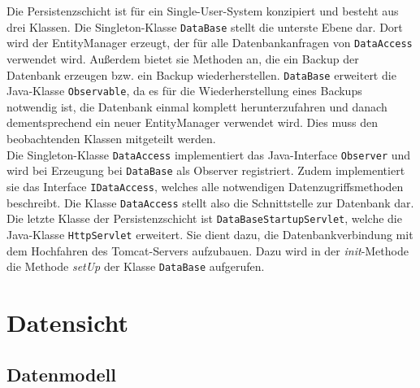 \documentclass[fontsize=12pt,paper=a4,twoside]{scrartcl}
\begin{document}

Die Persistenzschicht ist für ein Single-User-System konzipiert und besteht aus drei Klassen. Die Singleton-Klasse \texttt{DataBase} stellt die unterste Ebene dar. Dort wird der EntityManager erzeugt, der für alle Datenbankanfragen von \texttt{DataAccess} verwendet wird. Außerdem bietet sie Methoden an, die ein Backup der Datenbank erzeugen bzw. ein Backup wiederherstellen. \texttt{DataBase} erweitert die Java-Klasse \texttt{Observable}, da es für die Wiederherstellung eines Backups notwendig ist, die Datenbank einmal komplett herunterzufahren und danach dementsprechend ein neuer EntityManager verwendet wird. Dies muss den beobachtenden Klassen mitgeteilt werden.\\
Die Singleton-Klasse \texttt{DataAccess} implementiert das Java-Interface \texttt{Observer} und wird bei Erzeugung bei \texttt{DataBase} als Observer registriert. Zudem implementiert sie das Interface \texttt{IDataAccess}, welches alle notwendigen Datenzugriffsmethoden beschreibt. Die Klasse \texttt{DataAccess} stellt also die Schnittstelle zur Datenbank dar.\\
Die letzte Klasse der Persistenzschicht ist \texttt{DataBaseStartupServlet}, welche die Java-Klasse \texttt{HttpServlet} erweitert. Sie dient dazu, die Datenbankverbindung mit dem Hochfahren des Tomcat-Servers aufzubauen. Dazu wird in der \emph{init}-Methode die Methode \emph{setUp} der Klasse \texttt{DataBase} aufgerufen.



\section{Datensicht}
\label{sec:datensicht}
  
\subsection{Datenmodell}
\end{document}
